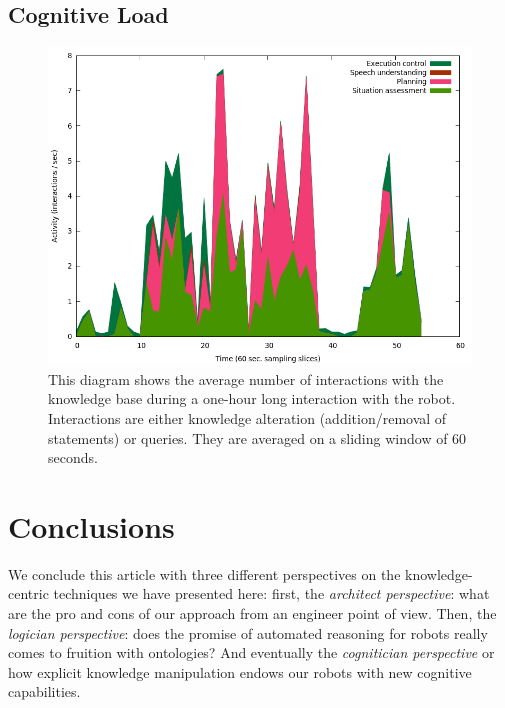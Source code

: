 \documentclass[letterpaper, 10 pt, conference]{ieeeconf}  %
\begin{document}
\subsection{Cognitive Load}

\begin{figure}
        \centering
        \includegraphics[width=\columnwidth]{figs/cognitive_load.png}
        \caption{This diagram shows the average number of interactions with the
        knowledge base during a one-hour long interaction with the robot.
        Interactions are either knowledge alteration (addition/removal of
        statements) or queries. They are averaged on a sliding window of 60 seconds.}
        \label{fig|cognitiveload}
\end{figure}

\section{Conclusions}
\label{sect|conclusion}

We conclude this article with three different perspectives on the knowledge-centric
techniques we have presented here: first, the \emph{architect perspective}:
what are the pro and cons of our approach from an engineer point of view. Then,
the \emph{logician perspective}: does the promise of automated reasoning for
robots really comes to fruition with ontologies? And eventually the
\emph{cognitician perspective} or how explicit knowledge manipulation endows
our robots with new cognitive capabilities.
\end{document}
